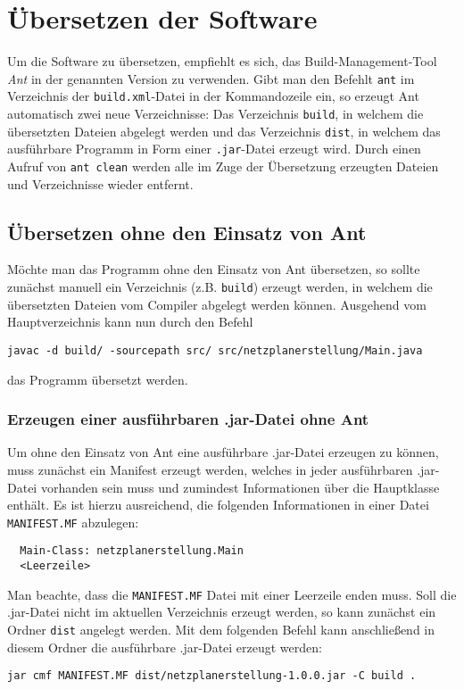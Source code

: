 \section{\"Ubersetzen der Software}

Um die Software zu \"ubersetzen, empfiehlt es sich, das
Build-Management-Tool \textit{Ant} in der genannten Version zu
verwenden. Gibt man den Befehlt \texttt{ant} im Verzeichnis der
\texttt{build.xml}-Datei in der Kommandozeile ein, so erzeugt Ant
automatisch zwei neue Verzeichnisse: Das Verzeichnis \texttt{build},
in welchem die \"ubersetzten Dateien abgelegt werden und das
Verzeichnis \texttt{dist}, in welchem das ausf\"uhrbare Programm in
Form einer \texttt{.jar}-Datei erzeugt wird.
Durch einen Aufruf von \texttt{ant clean} werden alle im Zuge der
\"Ubersetzung erzeugten Dateien und Verzeichnisse wieder entfernt.

\subsection{\"Ubersetzen ohne den Einsatz von Ant}

M\"ochte man das Programm ohne den Einsatz von Ant \"ubersetzen, so
sollte zun\"achst manuell ein Verzeichnis (z.B. \texttt{build})
erzeugt werden, in welchem die \"ubersetzten Dateien vom Compiler
abgelegt werden k\"onnen. Ausgehend vom Hauptverzeichnis kann nun
durch den Befehl
\begin{verbatim}
javac -d build/ -sourcepath src/ src/netzplanerstellung/Main.java
\end{verbatim}
das Programm \"ubersetzt werden.

\subsubsection{Erzeugen einer ausf\"uhrbaren .jar-Datei ohne Ant}

Um ohne den Einsatz von Ant eine ausf\"uhrbare .jar-Datei erzeugen zu
k\"onnen, muss zun\"achst ein Manifest erzeugt werden, welches in
jeder ausf\"uhrbaren .jar-Datei vorhanden sein muss und zumindest
Informationen \"uber die Hauptklasse enth\"alt. Es ist hierzu
ausreichend, die folgenden Informationen in einer Datei
\texttt{MANIFEST.MF} abzulegen:
\lstset{
  numbers=left
}
\begin{lstlisting}
  Main-Class: netzplanerstellung.Main
  <Leerzeile>
\end{lstlisting}
Man beachte, dass die \texttt{MANIFEST.MF} Datei mit einer Leerzeile
enden muss.
Soll die .jar-Datei nicht im aktuellen Verzeichnis erzeugt werden, so
kann zun\"achst ein Ordner \texttt{dist} angelegt werden. Mit dem
folgenden Befehl kann anschlie{\ss}end in diesem Ordner die
ausf\"uhrbare .jar-Datei erzeugt werden:
\begin{verbatim}
jar cmf MANIFEST.MF dist/netzplanerstellung-1.0.0.jar -C build .
\end{verbatim}

